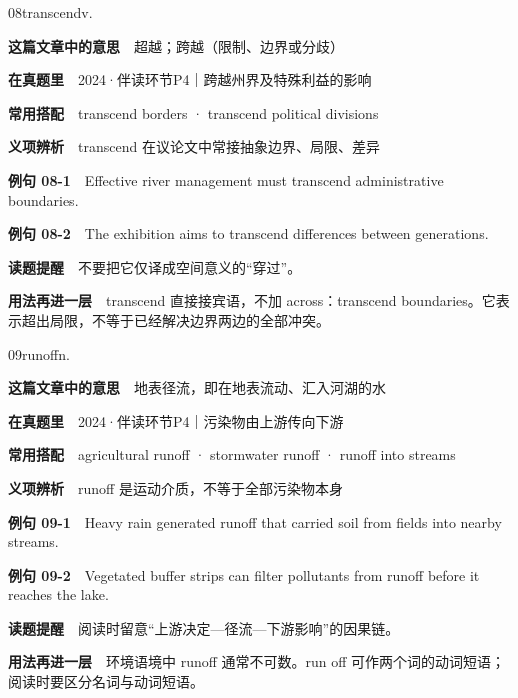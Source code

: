 \documentclass[a4paper,11pt,openany]{report}
\newcommand{\emphasislabel}[1]{\textcolor{leaf}{\CJKsf\bfseries #1}}
\begin{document}
\begin{vocabbox}{08}{transcend}{v.}

\textbf{这篇文章中的意思}　超越；跨越（限制、边界或分歧）

\textbf{在真题里}　2024·伴读环节P4｜跨越州界及特殊利益的影响

\textbf{常用搭配}　transcend borders · transcend political divisions

\textbf{义项辨析}　transcend 在议论文中常接抽象边界、局限、差异

\textbf{例句 08-1}　Effective river management must transcend administrative boundaries.

\textbf{例句 08-2}　The exhibition aims to transcend differences between generations.

\emphasislabel{读题提醒}　不要把它仅译成空间意义的``穿过''。

\textbf{用法再进一层}　transcend 直接接宾语，不加 across：transcend boundaries。它表示超出局限，不等于已经解决边界两边的全部冲突。

\end{vocabbox}

\begin{vocabbox}{09}{runoff}{n.}

\textbf{这篇文章中的意思}　地表径流，即在地表流动、汇入河湖的水

\textbf{在真题里}　2024·伴读环节P4｜污染物由上游传向下游

\textbf{常用搭配}　agricultural runoff · stormwater runoff · runoff into streams

\textbf{义项辨析}　runoff 是运动介质，不等于全部污染物本身

\textbf{例句 09-1}　Heavy rain generated runoff that carried soil from fields into nearby streams.

\textbf{例句 09-2}　Vegetated buffer strips can filter pollutants from runoff before it reaches the lake.

\emphasislabel{读题提醒}　阅读时留意``上游决定---径流---下游影响''的因果链。

\textbf{用法再进一层}　环境语境中 runoff 通常不可数。run off 可作两个词的动词短语；阅读时要区分名词与动词短语。

\end{vocabbox}
\end{document}
